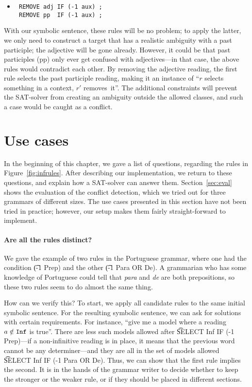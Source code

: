 {{ \begin{itemize}
 \item[] 
\begin{verbatim}
 REMOVE adj IF (-1 aux) ;
 REMOVE pp  IF (-1 aux) ;
 \end{verbatim}
 \end{itemize}

 With our symbolic sentence, these rules will be no problem; to apply the latter, we only need to construct a target that has a realistic ambiguity with a past participle; the adjective will be gone already.
However, it could be that past participles (pp) only ever get confused with adjectives---in that case, the above rules would contradict each other.
 By removing the adjective reading, the first rule selects the past participle reading, making it an instance of ``$r$ selects something in a context, $r'$ removes~it''. 
The additional constraints will prevent the SAT-solver from creating an ambiguity outside the allowed classes, and such a case would be caught as a conflict.


\section{Use cases}

In the beginning of this chapter, we gave a list of questions, regarding the rules in Figure~\ref{fig:infrules}. After describing our implementation, we return to these questions, and explain how a SAT-solver can answer them. 
Section~\ref{sec:eval} shows the evaluation of the conflict detection, which we tried out for three grammars of different sizes. 
The use cases presented in this section have not been tried in practice; however, our setup makes them fairly straight-forward to implement.

\paragraph{Are all the rules distinct?} We gave the example of two rules in the Portuguese grammar, where one had the condition \t{(-1 Prep)} and the other \t{(-1 Para OR De)}. A grammarian who has some knowledge of Portuguese could tell that {\em para} and {\em de} are both prepositions, so these two rules seem to do almost the same thing.

How can we verify this? To start, we apply all candidate rules to the same initial symbolic sentence. For the resulting symbolic sentence, we can ask for solutions with certain requirements.
For instance, ``give me a model where a reading $a \notin \texttt{Inf}$ is true''.
There are less such models allowed after \t{SELECT Inf IF (-1 Prep)}---if 
a non-infinitive reading is in place, it means that the previous word cannot be any determiner---and 
they are all in the set of models allowed \t{SELECT Inf IF (-1 Para OR De)}. Thus, we can show that the first rule implies the second. It is in the hands of the grammar writer to decide whether to keep the stronger or the weaker rule, or if they should be placed in different sections.


}}
